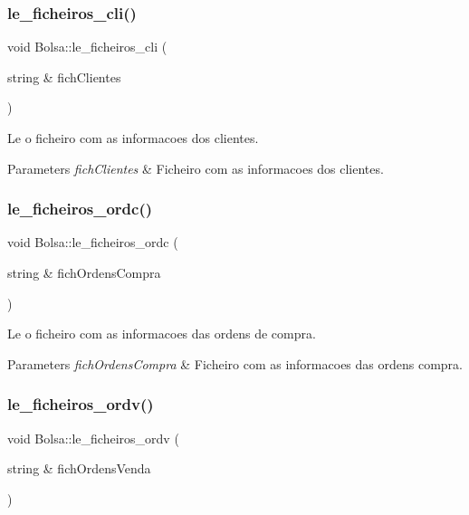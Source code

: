 \subsubsection{\texorpdfstring{le\+\_\+ficheiros\+\_\+cli()}{le\_ficheiros\_cli()}}
{\footnotesize\ttfamily void Bolsa\+::le\+\_\+ficheiros\+\_\+cli (\begin{DoxyParamCaption}\item[{string \&}]{fich\+Clientes }\end{DoxyParamCaption})}



Le o ficheiro com as informacoes dos clientes. 


\begin{DoxyParams}{Parameters}
{\em fich\+Clientes} & Ficheiro com as informacoes dos clientes. \\
\hline
\end{DoxyParams}
\hypertarget{class_bolsa_a57e3864eac22b2690e04fb8be39b5e58}{}\label{class_bolsa_a57e3864eac22b2690e04fb8be39b5e58} 
\subsubsection{\texorpdfstring{le\+\_\+ficheiros\+\_\+ordc()}{le\_ficheiros\_ordc()}}
{\footnotesize\ttfamily void Bolsa\+::le\+\_\+ficheiros\+\_\+ordc (\begin{DoxyParamCaption}\item[{string \&}]{fich\+Ordens\+Compra }\end{DoxyParamCaption})}



Le o ficheiro com as informacoes das ordens de compra. 


\begin{DoxyParams}{Parameters}
{\em fich\+Ordens\+Compra} & Ficheiro com as informacoes das ordens compra. \\
\hline
\end{DoxyParams}
\hypertarget{class_bolsa_ab0cd2fab3d7490d5d4a431e5cb1106e6}{}\label{class_bolsa_ab0cd2fab3d7490d5d4a431e5cb1106e6} 
\subsubsection{\texorpdfstring{le\+\_\+ficheiros\+\_\+ordv()}{le\_ficheiros\_ordv()}}
{\footnotesize\ttfamily void Bolsa\+::le\+\_\+ficheiros\+\_\+ordv (\begin{DoxyParamCaption}\item[{string \&}]{fich\+Ordens\+Venda }\end{DoxyParamCaption})}



